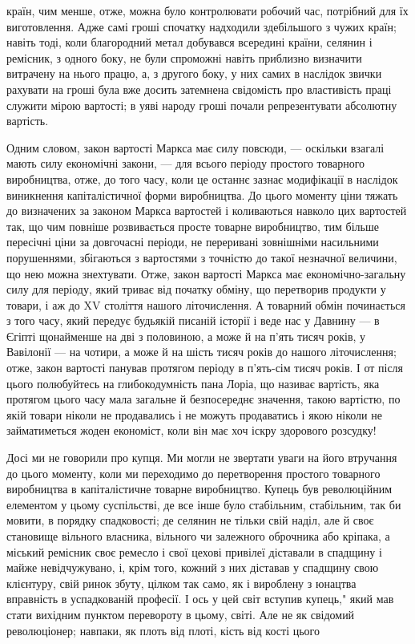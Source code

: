 \parcont{}  %
країн, чим менше, отже, можна було контролювати робочий час, потрібний для їх виготовлення. Адже самі гроші спочатку
надходили здебільшого з чужих країн; навіть тоді, коли благородний метал добувався всередині країни, селянин і ремісник, з
одного боку, не були спроможні навіть приблизно визначити витрачену на нього працю, а, з другого боку, у них самих в
наслідок звички рахувати на гроші була вже досить затемнена свідомість про властивість праці служити мірою вартості; в уяві
народу гроші почали репрезентувати абсолютну вартість.

Одним словом, закон вартості Маркса має силу повсюди, —  оскільки
взагалі мають силу економічні закони, — для всього періоду простого товарного виробництва, отже, до того часу, коли це
останнє зазнає модифікації в наслідок виникнення капіталістичної форми виробництва. До цього моменту ціни тяжать до
визначених за законом Маркса вартостей і коливаються навколо цих вартостей так, що чим повніше розвивається просте товарне
виробництво, тим більше пересічні ціни за довгочасні періоди, не переривані зовнішніми насильними порушеннями, збігаються з
вартостями з точністю до такої незначної величини, що нею можна знехтувати. Отже, закон вартості Маркса має
економічно-загальну силу для періоду, який триває від початку обміну, що перетворив продукти у товари, і аж до XV століття
нашого літочислення. А товарний обмін починається з того часу, який передує будьякій писаній історії і веде нас у Давнину —
в Єгіпті щонайменше на дві з половиною, а може й на п’ять тисяч років, у Вавілонії — на чотири, а може й на шість тисяч
років до нашого літочислення; отже, закон вартості панував протягом періоду в п’ять-сім тисяч років. І от після цього
полюбуйтесь на глибокодумність пана Лоріа, що називає вартість, яка протягом цього часу мала загальне й безпосереднє
значення, такою вартістю, по якій товари ніколи не продавались і не можуть продаватись і якою ніколи не займатиметься
жоден економіст, коли він має хоч іскру здорового розсудку!

Досі ми не говорили про купця. Ми могли не звертати уваги на його
втручання до цього моменту, коли ми переходимо до перетворення простого товарного виробництва в капіталістичне товарне
виробництво. Купець був революційним елементом у цьому суспільстві, де все інше було стабільним, стабільним, так би мовити,
в порядку спадковості; де селянин не тільки свій наділ, але й своє становище вільного власника, вільного чи залежного
оброчника або кріпака, а міський ремісник своє ремесло і свої цехові привілеї діставали в спадщину і майже невідчужувано, і,
крім того, кожний з них діставав у спадщину свою клієнтуру, свій ринок збуту, цілком так само, як і вироблену з юнацтва
вправність в успадкованій професії. І ось у цей світ вступив купець," який мав стати вихідним пунктом перевороту в цьому,
світі. Але не як свідомий революціонер; навпаки, як плоть від плоті, кість від кості цього
\parbreak{}  %
